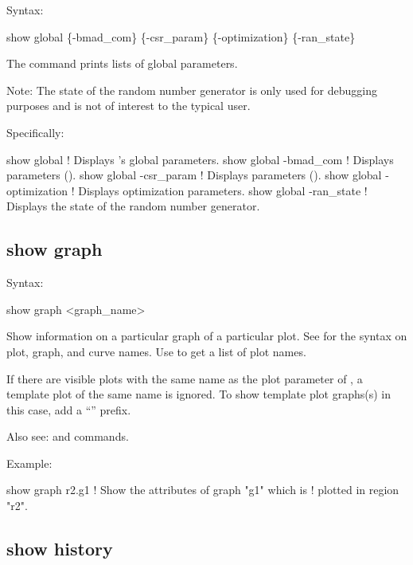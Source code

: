 {{{{{{{{Syntax:
\begin{example}
  show global \{-bmad_com\} \{-csr_param\} \{-optimization\} \{-ran_state\} 
\end{example}

The  command prints lists of global parameters.  

Note: The state of the random number generator is only used for debugging purposes and is not of
interest to the typical user.

Specifically:
\begin{example}
  show global               ! Displays \tao's global parameters.
  show global -bmad_com     ! Displays  parameters ().
  show global -csr_param    ! Displays  parameters ().
  show global -optimization ! Displays optimization parameters.
  show global -ran_state    ! Displays the state of the random number generator.
\end{example}


\subsection{show graph}
\label{s:show.graph}

Syntax:
\begin{example}
  show graph <graph_name>
\end{example}

Show information on a particular graph of a particular plot. See  for the syntax on
plot, graph, and curve names.  Use  to get a list of plot names.

If there are visible plots with the same name as the plot parameter of , a template plot
of the same name is ignored. To show template plot graphs(s) in this case, add a ``''
prefix.

Also see:  and  commands.

Example:
\begin{example}
  show graph r2.g1         ! Show the attributes of graph "g1" which is 
                           !   plotted in region "r2".
\end{example}


\subsection{show history}
\label{s:show.history}

}}}}}}}}
